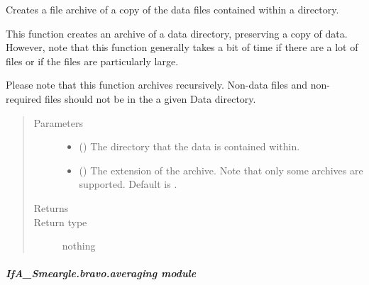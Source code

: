 \documentclass[letterpaper,10pt,english]{sphinxmanual}
\begin{document}
\begin{fulllineitems}
\label{\detokenize{python_docstrings/IfA_Smeargle.bravo.archiving:IfA_Smeargle.bravo.archiving.duplicate_archive_data_files}}
Creates a file archive of a copy of the data files contained within a
directory.

This function creates an archive of a data directory, preserving a copy
of data. However, note that this function generally takes a bit of time
if there are a lot of files or if the files are particularly large.

Please note that this function archives recursively. Non-data files and
non-required files should not be in the a given Data directory.
\begin{quote}\begin{description}
\item[{Parameters}] \leavevmode\begin{itemize}
\item {} 
 () \textendash{} The directory that the data is contained within.

\item {} 
 (\sphinxstyleliteralemphasis{\sphinxupquote{ (}}\sphinxstyleliteralemphasis{\sphinxupquote{)}}) \textendash{} The extension of the archive. Note that only some archives are
supported. Default is .

\end{itemize}

\item[{Returns}] \leavevmode


\item[{Return type}] \leavevmode
nothing

\end{description}\end{quote}

\end{fulllineitems}



\subparagraph{IfA\_Smeargle.bravo.averaging module}
\label{\detokenize{python_docstrings/IfA_Smeargle.bravo.averaging:module-IfA_Smeargle.bravo.averaging}}\label{\detokenize{python_docstrings/IfA_Smeargle.bravo.averaging:ifa-smeargle-bravo-averaging-module}}\label{\detokenize{python_docstrings/IfA_Smeargle.bravo.averaging::doc}}
\end{document}
